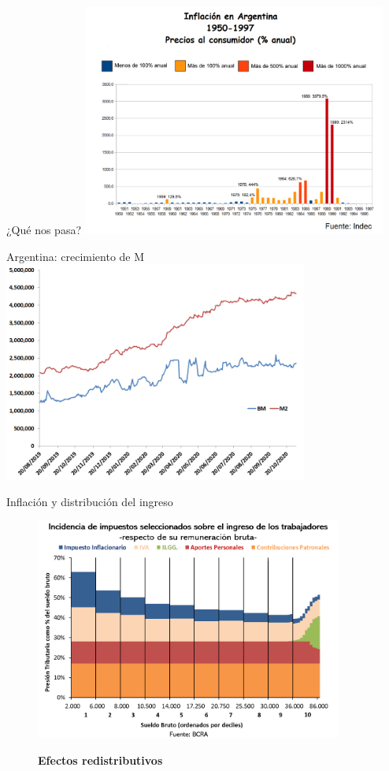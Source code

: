 \documentclass{beamer}
\begin{document}
\begin{frame}{¿Qué nos pasa?}
\centering\includegraphics[width=10cm]{Figures/infarg.png}\
\end{frame}

\begin{frame}{ Argentina: crecimiento de M }
\centering\includegraphics[width=10cm]{Figures/agregados.png}
\end{frame}

\begin{frame}{Inflación y distribución del ingreso}
    \begin{figure} [H]   
\centering\includegraphics[width=0.9\textwidth]{Figures/C33.10.png}\
\caption{\textbf{Efectos redistributivos}}
\end{figure}
\end{frame}
\end{document}
